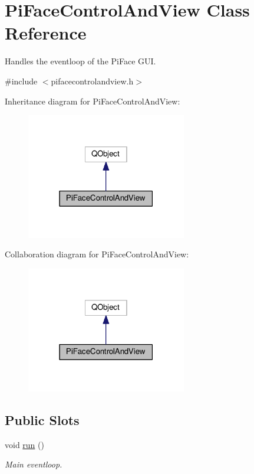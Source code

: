 \hypertarget{classPiFaceControlAndView}{}\section{Pi\+Face\+Control\+And\+View Class Reference}
\label{classPiFaceControlAndView}


Handles the eventloop of the Pi\+Face G\+UI.  




{\ttfamily \#include $<$pifacecontrolandview.\+h$>$}



Inheritance diagram for Pi\+Face\+Control\+And\+View\+:\nopagebreak
\begin{figure}[H]
\begin{center}
\leavevmode
\includegraphics[width=198pt]{classPiFaceControlAndView__inherit__graph}
\end{center}
\end{figure}


Collaboration diagram for Pi\+Face\+Control\+And\+View\+:\nopagebreak
\begin{figure}[H]
\begin{center}
\leavevmode
\includegraphics[width=198pt]{classPiFaceControlAndView__coll__graph}
\end{center}
\end{figure}
\subsection*{Public Slots}
\begin{DoxyCompactItemize}
\item 
void \hyperlink{classPiFaceControlAndView_a5463b09284910cea9db7997f59b5345a}{run} ()
\begin{DoxyCompactList}\small\item\em Main eventloop. \end{DoxyCompactList}\end{DoxyCompactItemize}
